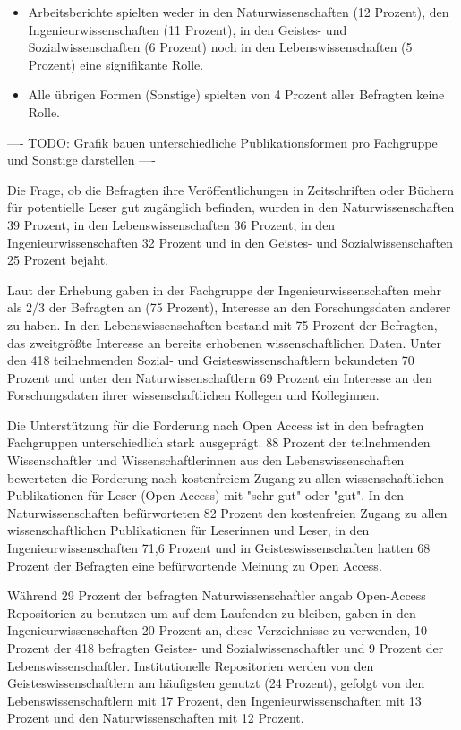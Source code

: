 \begin{itemize}
 \item  Arbeitsberichte spielten weder in den Naturwissenschaften (12 Prozent), den Ingenieurwissenschaften (11 Prozent), in den Geistes- und Sozialwissenschaften (6 Prozent) noch in den Lebenswissenschaften (5 Prozent) eine signifikante Rolle.
 \item Alle übrigen Formen (Sonstige) spielten von 4 Prozent aller Befragten keine Rolle.
 \end{itemize}

---- TODO: Grafik bauen unterschiedliche Publikationsformen pro Fachgruppe und Sonstige darstellen ----

Die Frage, ob die Befragten ihre Veröffentlichungen in Zeitschriften oder Büchern für potentielle Leser gut zugänglich befinden, wurden in den Naturwissenschaften 39 Prozent, in den Lebenswissenschaften 36 Prozent, in den Ingenieurwissenschaften 32 Prozent und in den Geistes- und Sozialwissenschaften 25 Prozent bejaht.

Laut der Erhebung gaben in der Fachgruppe der Ingenieurwissenschaften mehr als 2/3 der Befragten an (75 Prozent), Interesse an den Forschungsdaten anderer zu haben. In den Lebenswissenschaften bestand mit 75 Prozent der Befragten, das zweitgrößte Interesse an bereits erhobenen wissenschaftlichen Daten. Unter den 418 teilnehmenden Sozial- und Geisteswissenschaftlern bekundeten 70 Prozent und unter den Naturwissenschaftlern 69 Prozent ein Interesse an den Forschungsdaten ihrer wissenschaftlichen Kollegen und Kolleginnen.

Die Unterstützung für die Forderung nach Open Access ist in den befragten Fachgruppen unterschiedlich stark ausgeprägt. 88 Prozent der teilnehmenden Wissenschaftler und Wissenschaftlerinnen aus den Lebenswissenschaften bewerteten die Forderung nach kostenfreiem Zugang zu allen wissenschaftlichen Publikationen für Leser (Open Access) mit "sehr gut" oder "gut". In den Naturwissenschaften befürworteten 82 Prozent den kostenfreien Zugang zu allen wissenschaftlichen Publikationen für Leserinnen und Leser, in den Ingenieurwissenschaften 71,6 Prozent und in Geisteswissenschaften hatten 68 Prozent der Befragten eine befürwortende Meinung zu Open Access.

Während 29 Prozent der befragten Naturwissenschaftler angab Open-Access Repositorien zu benutzen um auf dem Laufenden zu bleiben, gaben in den Ingenieurwissenschaften 20 Prozent an, diese Verzeichnisse zu verwenden, 10 Prozent der 418 befragten Geistes- und Sozialwissenschaftler und 9 Prozent der Lebenswissenschaftler. Institutionelle Repositorien werden von den Geisteswissenschaftlern am häufigsten genutzt (24 Prozent), gefolgt von den Lebenswissenschaftlern mit 17 Prozent, den Ingenieurwissenschaften  mit 13 Prozent und den Naturwissenschaften mit 12 Prozent.

